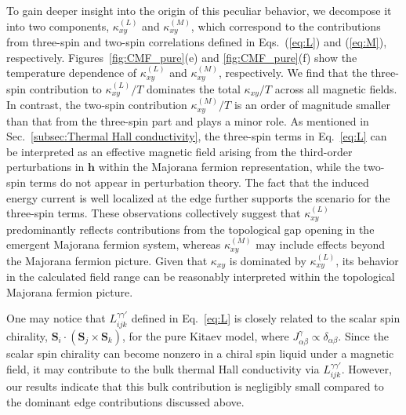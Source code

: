\documentclass[twocolumn,superscriptaddress,showpacs, longbibliography, aps, prx]{revtex4-2}
\begin{document}
To gain deeper insight into the origin of this peculiar behavior, we decompose it into two components, $\kappa_{xy}^{(L)}$ and  $\kappa_{xy}^{(M)}$, which correspond to the contributions from three-spin and two-spin correlations defined in Eqs.~(\ref{eq:L}) and (\ref{eq:M}), respectively.
Figures~\ref{fig:CMF_pure}(e) and \ref{fig:CMF_pure}(f) show the temperature dependence of $\kappa_{xy}^{(L)}$ and  $\kappa_{xy}^{(M)}$, respectively.
We find that the three-spin contribution to $\kappa_{xy}^{(L)}/T$ dominates the total $\kappa_{xy}/T$ across all magnetic fields.
In contrast, the two-spin contribution $\kappa_{xy}^{(M)}/T$ is an order of magnitude smaller than that from the three-spin part and plays a minor role.
As mentioned in Sec.~\ref{subsec:Thermal Hall conductivity}, the three-spin terms in Eq.~\eqref{eq:L} can be interpreted as an effective magnetic field arising from the third-order perturbations in $\bm{h}$ within the Majorana fermion representation, while the two-spin terms do not appear in perturbation theory. 
The fact that the induced energy current is well localized at the edge further supports the scenario for the three-spin terms. 
These observations collectively suggest that $\kappa_{xy}^{(L)}$ predominantly reflects contributions from the topological gap opening in the emergent Majorana fermion system, whereas
$\kappa_{xy}^{(M)}$ may include effects beyond the Majorana fermion picture.
Given that $\kappa_{xy}$ is dominated by $\kappa_{xy}^{(L)}$, 
its behavior in the calculated field range can be reasonably interpreted within the topological Majorana fermion picture.

One may notice that $L_{ijk}^{\gamma\gamma'}$ defined in Eq.~\eqref{eq:L} is closely related to 
the scalar spin chirality, $\bm{S}_i\cdot (\bm{S}_j \times \bm{S}_k)$, for the pure Kitaev model, where $J^\gamma_{\alpha\beta} \propto \delta_{\alpha\beta}$. 
Since the scalar spin chirality can become nonzero in a chiral spin liquid under a magnetic field, it may contribute to the bulk thermal Hall conductivity via $L_{ijk}^{\gamma\gamma'}$.
However, our results indicate that this bulk contribution is negligibly small compared to the dominant edge contributions discussed above. 
\end{document}
